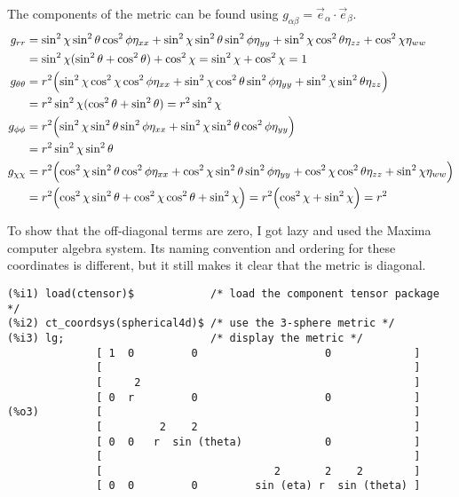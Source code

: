 \documentclass[gr-notes.tex]{subfiles}
\begin{document}
\begin{enumerate}[(a)]
The components of the metric can be found using
$g_{\alpha\beta} = \vec{e}_\alpha \cdot \vec{e}_\beta$.
%
\begin{align*}
  g_{rr} &=
  \sin^2\chi \sin^2\theta \cos^2\phi \eta_{xx} +
  \sin^2\chi \sin^2\theta \sin^2\phi \eta_{yy} +
  \sin^2\chi \cos^2\theta \eta_{zz} +
  \cos^2\chi \eta_{ww}
  \\* &=
  \sin^2\chi (\sin^2\theta + \cos^2\theta) + \cos^2\chi =
  \sin^2\chi + \cos^2\chi =
  1
  \\
  g_{\theta\theta} &=
  r^2 \qty(
    \sin^2\chi \cos^2\chi \cos^2\phi \eta_{xx} +
    \sin^2\chi \cos^2\theta \sin^2\phi \eta_{yy} +
    \sin^2\chi \sin^2\theta \eta_{zz}
  )
  \\* &=
  r^2 \sin^2\chi (\cos^2\theta + \sin^2\theta) =
  r^2 \sin^2\chi
  \\
  g_{\phi\phi} &=
  r^2 \qty(
    \sin^2\chi \sin^2\theta \sin^2\phi \eta_{xx} +
    \sin^2\chi \sin^2\theta \cos^2\phi \eta_{yy}
  )
  \\* &=
  r^2 \sin^2\chi \sin^2\theta
  \\
  g_{\chi\chi} &=
  r^2 \qty(
    \cos^2\chi \sin^2\theta \cos^2\phi \eta_{xx} +
    \cos^2\chi \sin^2\theta \sin^2\phi \eta_{yy} +
    \cos^2\chi \cos^2\theta \eta_{zz} +
    \sin^2\chi \eta_{ww}
  )
  \\* &=
  r^2 \qty(
    \cos^2\chi \sin^2\theta +
    \cos^2\chi \cos^2\theta +
    \sin^2\chi
  ) =
  r^2 \qty( \cos^2\chi + \sin^2\chi ) =
  r^2
\end{align*}

To show that the off-diagonal terms are zero, I got lazy and used the Maxima computer algebra system. Its naming convention and ordering for these coordinates is different, but it still makes it clear that the metric is diagonal.

\begin{verbatim}
(%i1) load(ctensor)$            /* load the component tensor package */
(%i2) ct_coordsys(spherical4d)$ /* use the 3-sphere metric */
(%i3) lg;                       /* display the metric */
              [ 1  0         0                    0             ]
              [                                                 ]
              [     2                                           ]
              [ 0  r         0                    0             ]
(%o3)         [                                                 ]
              [         2    2                                  ]
              [ 0  0   r  sin (theta)             0             ]
              [                                                 ]
              [                           2       2    2        ]
              [ 0  0         0         sin (eta) r  sin (theta) ]
\end{verbatim}


\end{enumerate}
\end{document}
